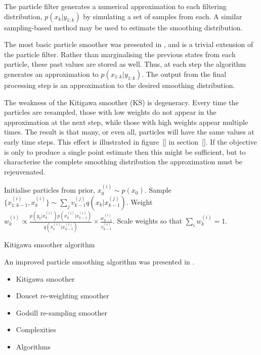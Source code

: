\documentclass[journal]{IEEEtran}
\begin{document}
The particle filter generates a numerical approximation to each filtering distribution, $p(x_k|y_{1:k})$ by simulating a set of samples from each. A similar sampling-based method may be used to estimate the smoothing distribution.

The most basic particle smoother was presented in \cite{Kitigawa1996}, and is a trivial extension of the particle filter. Rather than marginalising the previous states from each particle, these past values are stored as well. Thus, at each step the algorithm generates an approximation to $p(x_{1:k}|y_{1:k})$. The output from the final processing step is an approximation to the desired smoothing distribution.

The weakness of the Kitigawa smoother (KS) is degeneracy. Every time the particles are resampled, those with low weights do not appear in the approximation at the next step, while those with high weights appear multiple times. The result is that many, or even all, particles will have the same values at early time steps. This effect is illustrated in figure~\ref{} in section~\ref{}. If the objective is only to produce a single point estimate then this might be sufficient, but to characterise the complete smoothing distribution the approximation must be rejeuvenated.

\begin{algorithm}
  \begin{algorithmic}
  	\STATE Initialise particles from prior, $x_{0}^{(i)} \sim p(x_{0})$.
  			\STATE Sample $\{ x_{1:k-1}^{(i)}, x_k^{(i)} \} \sim \sum_j v_{k-1}^{(j)} q(x_k|x_{k-1}^{(j)})$.
  			\STATE Weight $w_{k}^{(i)} \propto \frac{ p(y_k|x_k^{(i)}) p(x_k^{(i)}|x_{k-1}^{(i)}) }{ q(x_{x}^{(i)}|x_{k-1}^{(i)}) } \times \frac{w_{k-1}^{(i)}}{v_{k-1}^{(i)} }$.
  		\ENDFOR
  	  \STATE Scale weights so that $\sum_i w_{k}^{(i)} = 1$.
  	\ENDFOR
  \end{algorithmic}
  \caption{Kitigawa smoother algorithm}
  \label{alg:PF}
\end{algorithm}

An improved particle smoothing algorithm was presented in \cite{Godsill2004}. 



\newpage

\begin{itemize}
	\item Kitigawa smoother
	\item Doucet re-weighting smoother
	\item Godsill re-sampling smoother
	\item Complexities
	\item Algorithms
\end{itemize}
\end{document}
